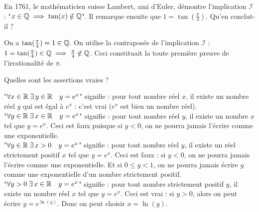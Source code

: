 \begin{question}
En 1761, le mathématicien suisse Lambert, ami d'Euler, démontre l'implication $\mathcal{I}$ : "$x \in \mathbb{Q} \implies \tan(x) \notin \mathbb{Q}$". Il remarque ensuite que $1 = \tan(\frac{\pi}{4})$. Qu'en conclut-il ?
\begin{answers} 
\end{answers}
\begin{explanations} 
On a $\tan(\frac{\pi}{4}) = 1 \in \mathbb{Q}$. On utilise la contraposée de l'implication $\mathcal{I}$ : $1 = \tan(\frac{\pi}{4}) \in \mathbb{Q} \implies \frac{\pi}{4} \notin \mathbb{Q}$. Ceci constituait la toute première preuve de l'irrationalité de $\pi$.
\end{explanations}
\end{question}


\begin{question}
Quelles sont les assertions vraies ?
\begin{answers} 
\end{answers}
\begin{explanations} 
"$\forall x \in \mathbb{R} \; \exists \, y \in \mathbb{R} \quad y = e^x$" signifie : pour tout nombre réel $x$, il existe un nombre réel $y$ qui est égal à $e^x$ : c'est vrai ($e^x$ est bien un nombre réel).\\
"$\forall y \in \mathbb{R} \; \exists \, x \in \mathbb{R} \quad y = e^x$" signifie : pour tout nombre réel $y$, il existe un nombre $x$ tel que $y = e^x$. Ceci est faux puisque si $y<0$, on ne pourra jamais l'écrire comme une exponentielle.\\
"$\forall y \in \mathbb{R} \; \exists \, x > 0 \quad y = e^x$" signifie : pour tout nombre réel $y$, il existe un réel strictement positif $x$ tel que $y = e^x$. Ceci est faux : si $y<0$, on ne pourra jamais l'écrire comme une exponentielle. Et si $0 \leq y < 1$, on ne pourra jamais écrire $y$ comme une exponentielle d'un nombre strictement positif.\\
"$\forall y > 0 \; \exists \, x \in \mathbb{R} \quad y = e^x$" signifie : pour tout nombre strictement positif $y$, il existe un nombre réel $x$ tel que $y = e^x$. Ceci est vrai : si $y>0$, alors on peut écrire $y = e^{\ln(y)}$. Donc on peut choisir $x = \ln(y)$.
\end{explanations}
\end{question}


